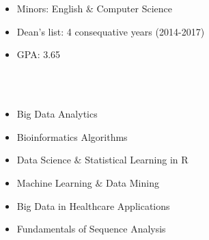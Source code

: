 \documentclass[hidelinks, 11pt]{article}
\begin{document}
\section*{}
\begin{addmargin}{.5in}

  \begin{itemize}\setlength\itemsep{-4pt}
    \item{Minors: English $\&$ Computer Science}
    \item{Dean's list: 4 consequative years (2014-2017)}
    \item{GPA: 3.65}
  \end{itemize}
   \\ \\
  \vspace{-9pt}
  \begin{multicols}{2}
    \begin{itemize}\setlength\itemsep{-4pt}
      \item{Big Data Analytics}
      \item{Bioinformatics Algorithms}
      \item{Data Science $\&$ Statistical Learning in R}
      \item{Machine Learning $\&$ Data Mining}
      \item{Big Data in Healthcare Applications}
      \item{Fundamentals of Sequence Analysis}
    \end{itemize}
  \end{multicols}
\end{addmargin}
\vspace{-6pt}

\end{document}
